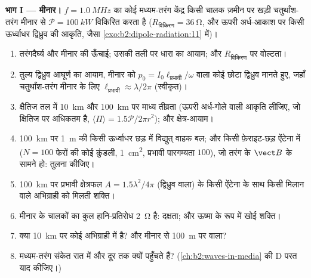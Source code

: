 \begin{problem}[{सप्ताहांत समस्या --- तीन ऐंटेना: कोई प्रसारण
मीनार, धूप में हवा का कोई अणु, और कोई मुक्त इलेक्ट्रॉन}]
\label{pb:b2:dipole-radiation:1}

\medskip
\noindent\textbf{भाग I --- मीनार।}
$f = \qty{1.0}{MHz}$ का कोई मध्यम-तरंग केंद्र किसी चालक ज़मीन पर खड़ी चतुर्थांश-तरंग
मीनार से $\mathcal P = \qty{100}{kW}$ विकिरित करता है ($R_{\text{विकिरण}} = \qty{36}{\ohm}$,
और ऊपरी अर्ध-आकाश पर किसी ऊर्ध्वाधर द्विध्रुव की आकृति, जैसा
\cref{exo:b2:dipole-radiation:11} में)।
\begin{enumerate}
  \item तरंगदैर्घ्य और मीनार की ऊँचाई; उसकी तली पर धारा का आयाम;
        और $R_{\text{विकिरण}}$ पर वोल्टता।
  \item तुल्य द्विध्रुव आघूर्ण का आयाम, मीनार को $p_0 = I_0\ell_{\text{प्रभावी}}/\omega$ वाला
        कोई छोटा द्विध्रुव मानते हुए, जहाँ चतुर्थांश-तरंग मीनार के लिए $\ell_{\text{प्रभावी}} \approx
        \lambda/2\pi$ (स्वीकृत)।
  \item क्षैतिज तल में \qty{10}{km} और \qty{100}{km} पर माध्य तीव्रता
        (ऊपरी अर्ध-गोले वाली आकृति लीजिए, जो क्षितिज पर अधिकतम है,
        $\langle\Pi\rangle = 1.5\mathcal P/2\pi r^2$); और क्षेत्र-आयाम।
  \item \qty{100}{km} पर \qty{1}{m} की किसी ऊर्ध्वाधर छड़ में विद्युत् वाहक बल; और
        किसी फ़ेराइट-छड़ ऐंटेना में ($N = 100$ फेरों की कोई कुंडली,
        \qty{1}{cm^2}, प्रभावी पारगम्यता $100$), जो तरंग के $\vect B$ के सामने हो: तुलना कीजिए।
  \item \qty{100}{km} पर प्रभावी क्षेत्रफल $A = 1.5\lambda^2/4\pi$ (द्विध्रुव वाला)
        के किसी ऐंटेना के साथ किसी मिलान वाले अभिग्राही को मिलती शक्ति।
  \item मीनार के चालकों का कुल हानि-प्रतिरोध
        \qty{2}{\ohm} है: दक्षता; और ऊष्मा के रूप में खोई शक्ति।
  \item क्या \qty{10}{km} पर कोई अभिग्राही  में है? और मीनार से
        \qty{100}{m} पर वाला?
  \item मध्यम-तरंग संकेत रात में और दूर तक क्यों पहुँचते हैं?
        (\cref{ch:b2:waves-in-media} की D परत याद कीजिए।)
\end{enumerate}


\end{problem}
